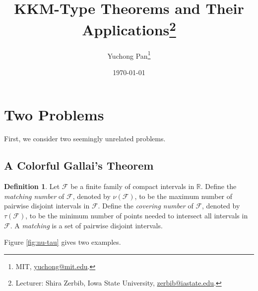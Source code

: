 \documentclass[letterpaper, reqno,12pt]{article}
\newcommand{\RR}{\mathbb{R}}
\begin{document}
\title{KKM-Type Theorems and Their Applications\footnote{Lecturer: Shira Zerbib, Iowa State University, \href{mailto:zerbib@iastate.edu}{zerbib@iastate.edu}.}}
\author{Yuchong Pan\thanks{MIT, \href{mailto:yuchong@mit.edu}{yuchong@mit.edu}.}}
\date{\today}
\newtheorem{theorem}{Theorem}
\newtheorem{lemma}[theorem]{Lemma}
\newtheorem{corollary}[theorem]{Corollary}
\newtheorem{problem}[theorem]{Problem}
\theoremstyle{definition} \newtheorem{definition}[theorem]{Definition}
\maketitle
%

\section{Two Problems}

First, we consider two seemingly unrelated problems.

\subsection{A Colorful Gallai's Theorem}

\begin{definition}
  Let $\mathcal F$ be a finite family of compact intervals in $\RR$. Define the \emph{matching number} of $\mathcal F$, denoted by $\nu(\mathcal F)$, to be the maximum number of pairwise disjoint intervals in $\mathcal F$. Define the \emph{covering number} of $\mathcal F$, denoted by $\tau(\mathcal F)$, to be the minimum number of points needed to intersect all intervals in $\mathcal F$. A \emph{matching} is a set of pairwise disjoint intervals.
\end{definition}

Figure \ref{fig:nu-tau} gives two examples.
\end{document}
